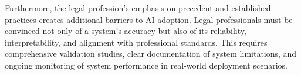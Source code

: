 Furthermore, the legal profession's emphasis on precedent and established practices creates additional barriers to AI adoption. Legal professionals must be convinced not only of a system's accuracy but also of its reliability, interpretability, and alignment with professional standards. This requires comprehensive validation studies, clear documentation of system limitations, and ongoing monitoring of system performance in real-world deployment scenarios.